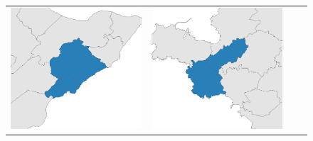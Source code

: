 \begin{figure}[p]
\begin{tabularx}{1\textwidth}{XXXX}
\includegraphics[width=1\linewidth]{images/ch6/mergefocus/09}&
\includegraphics[width=1\linewidth]{images/ch6/mergefocus/10}&

\end{tabularx}
\end{figure}
